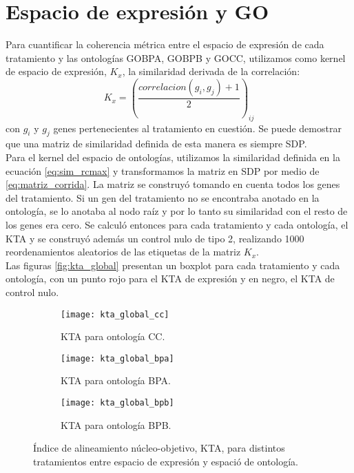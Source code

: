 \section{Espacio de expresión y GO}
Para cuantificar la coherencia métrica entre el espacio de expresión de cada tratamiento y las ontologías GOBPA, GOBPB y GOCC, utilizamos como kernel de espacio de expresión, $K_x$, la similaridad derivada de la correlación:
\begin{equation}
	K_x = (\frac{correlacion(g_i, g_j)+1}{2})_{ij}
	\label{eq:similaridad_de_correlacion}
\end{equation}
con $g_i$ y $g_j$ genes pertenecientes al tratamiento en cuestión. Se puede demostrar que una matriz de similaridad definida de esta manera es siempre SDP.\\
Para el kernel del espacio de ontologías, utilizamos la similaridad definida en la ecuación \ref{eq:sim_rcmax} y transformamos la matriz en SDP por medio de \ref{eq:matriz_corrida}. La matriz se construyó tomando en cuenta todos los genes del tratamiento. Si un gen del tratamiento no se encontraba anotado en la ontología, se lo anotaba al nodo raíz y por lo tanto su similaridad con el resto de los genes era cero. Se calculó entonces para cada tratamiento y cada ontología, el KTA y se construyó además un control nulo de tipo 2, realizando 1000 reordenamientos aleatorios de las etiquetas de la matriz $K_x$.\\
Las figuras \ref{fig:kta_global} presentan un boxplot para cada tratamiento y cada ontología, con un punto rojo para el KTA de expresión y en negro, el KTA de control nulo. 
\begin{figure*}[t!]
    \centering
    \begin{subfigure}[t]{0.5\textwidth}
    \centering
    \texttt{[image: kta\_global\_cc]}
    \caption{KTA para ontología CC.}
    \end{subfigure}
    \begin{subfigure}[t]{0.5\textwidth}
    \centering
    \texttt{[image: kta\_global\_bpa]}
    \caption{KTA para ontología BPA.}
    \end{subfigure}
    \begin{subfigure}[t]{0.5\textwidth}
    \centering
    \texttt{[image: kta\_global\_bpb]}
    \caption{KTA para ontología BPB.}
    \end{subfigure}    
    \caption{Índice de alineamiento núcleo-objetivo, KTA, para distintos tratamientos entre espacio de expresión y espació de ontología.}
    \label{kta_global}
\end{figure*}
